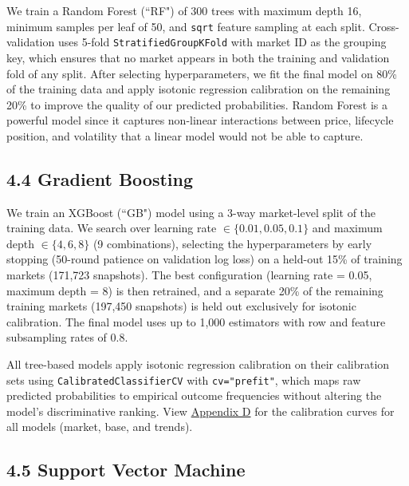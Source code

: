 \documentclass[11pt,twocolumn]{article}
\begin{document}
We train a Random Forest (``RF") of 300 trees with maximum depth 16, minimum samples per leaf of 50, and \texttt{sqrt} feature sampling at each split. Cross-validation uses 5-fold \texttt{StratifiedGroupKFold} with market ID as the grouping key, which ensures that no market appears in both the training and validation fold of any split. After selecting hyperparameters, we fit the final model on 80\% of the training data and apply isotonic regression calibration on the remaining 20\% to improve the quality of our predicted probabilities. Random Forest is a powerful model since it captures non-linear interactions between price, lifecycle position, and volatility that a linear model would not be able to capture.

\subsection*{4.4 Gradient Boosting}

We train an XGBoost (``GB") model using a 3-way market-level split of the training data. We search over learning rate $\in \{0.01, 0.05, 0.1\}$ and maximum depth $\in \{4, 6, 8\}$ (9 combinations), selecting the hyperparameters by early stopping (50-round patience on validation log loss) on a held-out 15\% of training markets (171,723 snapshots). The best configuration (learning rate = 0.05, maximum depth = 8) is then retrained, and a separate 20\% of the remaining training markets (197,450 snapshots) is held out exclusively for isotonic calibration. The final model uses up to 1,000 estimators with row and feature subsampling rates of 0.8.

All tree-based models apply isotonic regression calibration on their calibration sets using \texttt{CalibratedClassifierCV} with \texttt{cv="prefit"}, which maps raw predicted probabilities to empirical outcome frequencies without altering the model's discriminative ranking. View \hyperref[sec:calibration-curves]{Appendix D} for the calibration curves for all models (market, base, and trends).

\subsection*{4.5 Support Vector Machine}
\end{document}
